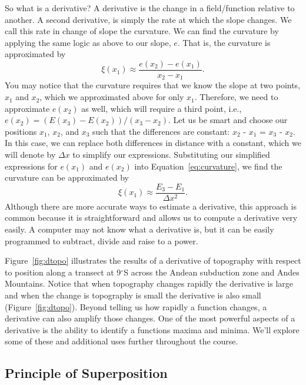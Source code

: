 So what is a derivative?  A derivative is the change in a field/function relative to another.  A second derivative, is simply the rate at which the slope changes.  We call this rate in change of slope the curvature.  We can find the curvature by applying the same logic as above to our slope, $e$.  That is, the curvature is approximated by
\[
    \xi(x_1) \approx \frac{e(x_2) - e(x_1)}{x_2 - x_1} .
    \label{eq:curvature}
\]
You may notice that the curvature requires that we know the slope at two points, $x_1$ and $x_2$, which we approximated above for only $x_1$.  Therefore, we need to approximate $e(x_2)$ as well, which will require a third point, i.e., $e(x_2) = (E(x_3) - E(x_2))/(x_3 - x_2)$.  Let us be smart and choose our positions $x_1$, $x_2$, and $x_3$ such that the differences are constant: $x_2$ - $x_1$ = $x_3$ - $x_2$.  In this case, we can replace both differences in distance with a constant, which we will denote by $\Delta\! x$ to simplify our expressions.  Substituting our simplified expressions for $e(x_1)$ and $e(x_2)$ into Equation~\ref{eq:curvature}, we find the curvature can be approximated by
\[
    \xi(x_1) \approx \frac{ E_3 - E_1 }{\Delta\! x^2} .
\]
Although there are more accurate ways to estimate a derivative, this approach is common because it is straightforward and allows us to compute a derivative very easily.  A computer may not know what a derivative is, but it can be easily programmed to subtract, divide and raise to a power.

Figure~\ref{fig:dtopo} illustrates the results of a derivative of topography with respect to position along a transect at 9$^\circ$S across the Andean subduction zone and Andes Mountains.  Notice that when topography changes rapidly the derivative is large and when the change is topography is small the derivative is also small (Figure~\ref{fig:dtopo}).  Beyond telling us how rapidly a function changes, a derivative can also amplify those changes.  One of the most powerful aspects of a derivative is the ability to identify a functions maxima and minima.  We'll explore some of these and additional uses further throughout the course.

\subsection{Principle of Superposition}\label{sec:superposition}

